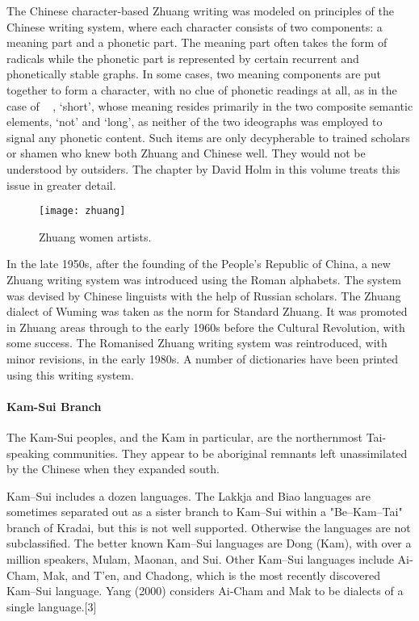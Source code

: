 The Chinese character-based Zhuang writing was modeled on principles of the Chinese
writing system, where each character consists of two components: a meaning part and a
phonetic part. The meaning part often takes the form of radicals while the phonetic part is
represented by certain recurrent and phonetically stable graphs. In some cases, two meaning
components are put together to form a character, with no clue of phonetic readings at all, as
in the case of 􀏡􀀎􄭓, ‘short’, whose meaning resides primarily in the two composite semantic elements, ‘not’ and ‘long’, as neither of the two ideographs was employed to
signal any phonetic content. Such items are only decypherable to trained scholars or shamen
who knew both Zhuang and Chinese well. They would not be understood by outsiders. The
chapter by David Holm in this volume treats this issue in greater detail.

\begin{figure}[htbp]
\texttt{[image: zhuang]}
\caption{Zhuang women artists.}
\end{figure}

In the late 1950s, after the founding of the People’s Republic of China, a new Zhuang
writing system was introduced using the Roman alphabets. The system was devised by
Chinese linguists with the help of  Russian scholars. The Zhuang dialect of Wuming
was taken as the norm for Standard Zhuang. It was promoted in Zhuang areas through to the
early 1960s before the Cultural Revolution, with some success. The Romanised Zhuang
writing system was reintroduced, with minor revisions, in the early 1980s. A number of
dictionaries have been printed using this writing system.


\paragraph{Kam-Sui Branch} 

The Kam-Sui peoples, and the Kam in particular, are the northernmost Tai-speaking communities. They appear to be aboriginal remnants left unassimilated by the Chinese when they expanded south. 

Kam–Sui includes a dozen languages. The Lakkja and Biao languages are sometimes separated out as a sister branch to Kam–Sui within a "Be–Kam–Tai" branch of Kradai, but this is not well supported. Otherwise the languages are not subclassified.
The better known Kam–Sui languages are Dong (Kam), with over a million speakers, Mulam, Maonan, and Sui. Other Kam–Sui languages include Ai-Cham, Mak, and T’en, and Chadong, which is the most recently discovered Kam–Sui language. Yang (2000) considers Ai-Cham and Mak to be dialects of a single language.[3]

